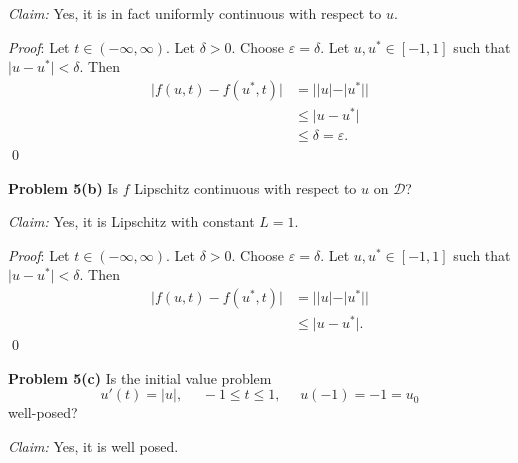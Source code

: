 \documentclass[12pt]{article}
\newcommand{\problem}[1]{\hspace{-4 ex} \large \textbf{Problem #1} }
\renewenvironment{proof}{\hspace{-4 ex} \emph{Proof}:}{\qed}
\begin{document}
\textit{Claim:} Yes, it is in fact uniformly continuous with respect to $u$. \bigbreak

\begin{proof}
	Let $t \in (-\infty, \infty)$. Let $\delta >0$. Choose $\varepsilon = \delta$. Let $u, u^* \in [-1, 1]$ such that $\vert u - u^* \vert < \delta$. Then 
	\begin{align*}
		\vert f(u, t) - f(u^*,t) \vert &= \big \vert \vert u \vert - \vert u^* \vert \big \vert  \\
		& \leq \vert u - u^* \vert \tag{reverse triangle inequality} \\
		& \leq \delta = \varepsilon.
	\end{align*}
\end{proof}

\bigbreak
\problem{5(b)} Is $f$ Lipschitz continuous with respect to $u$ on $\mathcal{D}$? \bigbreak

\textit{Claim:} Yes, it is Lipschitz with constant $L = 1$. \bigbreak

\begin{proof}
	Let $t \in (-\infty, \infty)$. Let $\delta >0$. Choose $\varepsilon = \delta$. Let $u, u^* \in [-1, 1]$ such that $\vert u - u^* \vert < \delta$. Then 
	\begin{align*}
		\vert f(u, t) - f(u^*,t) \vert &= \big \vert \vert u \vert - \vert u^* \vert \big \vert  \\
		& \leq \vert u - u^* \vert. \tag{reverse triangle inequality}
	\end{align*}
\end{proof}

\bigbreak
\problem{5(c)} Is the initial value problem 
$$
u'(t) = \vert u \vert, \phantom{=} -1 \leq t \leq 1, \phantom{=}u(-1)=-1 = u_0
$$
well-posed? \bigbreak

\textit{Claim:} Yes, it is well posed. \bigbreak
\end{document}
